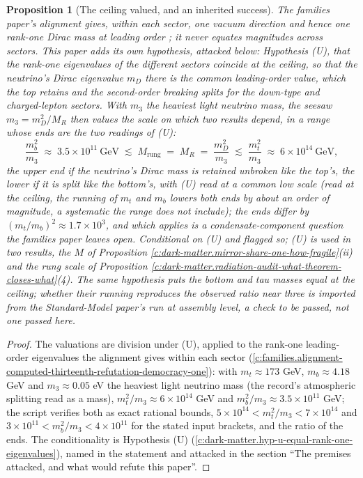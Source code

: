 \documentclass[11pt]{article}
\newtheorem{proposition}[theorem]{Proposition}
\theoremstyle{definition}
\theoremstyle{plain}
\newcommand{\changedmark}[2]{\marginpar{\raggedright\scriptsize\color{#1}#2}}
\begin{document}
\begin{proposition}[The ceiling valued, and an inherited success]\label{c:dark-matter.ceiling-valued-inherited-success}
\changedmark{gray}{reworded}
The families paper's alignment gives, within each sector, one vacuum direction and hence one rank-one Dirac mass at leading order \cite[Prop.~4.3]{ButlerT13}; it never equates magnitudes across sectors. This paper adds its own hypothesis, attacked below: \emph{Hypothesis (U)}, that the rank-one eigenvalues of the different sectors coincide at the ceiling, so that the neutrino's Dirac eigenvalue $m_{D}$ there is the common leading-order value, which the top retains and the second-order breaking splits for the down-type and charged-lepton sectors. With $m_{3}$ the heaviest light neutrino mass, the seesaw $m_{3} = m_{D}^{2}/M_{R}$ then values the scale on which two results depend, in a range whose ends are the two readings of (U):
\[
\frac{m_{b}^{2}}{m_{3}} \;\approx\; 3.5 \times 10^{11}\ \mathrm{GeV} \;\lesssim\; M_{\mathrm{rung}} \;=\; M_{R} \;=\; \frac{m_{D}^{2}}{m_{3}} \;\lesssim\; \frac{m_{t}^{2}}{m_{3}} \;\approx\; 6 \times 10^{14}\ \mathrm{GeV},
\]
the upper end if the neutrino's Dirac mass is retained unbroken like the top's, the lower if it is split like the bottom's, with (U) read at a common low scale (read at the ceiling, the running of $m_{t}$ and $m_{b}$ lowers both ends by about an order of magnitude, a systematic the range does not include); the ends differ by $(m_{t}/m_{b})^{2} \approx 1.7 \times 10^{3}$, and which applies is a condensate-component question the families paper leaves open. Conditional on (U) and flagged so; (U) is used in two results, the $M$ of Proposition \ref{c:dark-matter.mirror-share-one-how-fragile}(ii) and the rung scale of Proposition \ref{c:dark-matter.radiation-audit-what-theorem-closes-what}(4). The same hypothesis puts the bottom and tau masses equal at the ceiling; whether their running reproduces the observed ratio near three is imported from the Standard-Model paper's run \cite{ButlerT12} at assembly level, a check to be passed, not one passed here.
\end{proposition}
\begin{proof}
The valuations are division under (U), applied to the rank-one leading-order eigenvalues the alignment gives within each sector (\ref{c:families.alignment-computed-thirteenth-refutation-democracy-one}): with $m_{t} \approx 173$ GeV, $m_{b} \approx 4.18$ GeV and $m_{3} \approx 0.05$ eV the heaviest light neutrino mass (the record's atmospheric splitting read as a mass), $m_{t}^{2}/m_{3} \approx 6 \times 10^{14}$ GeV and $m_{b}^{2}/m_{3} \approx 3.5 \times 10^{11}$ GeV; the script verifies both as exact rational bounds, $5 \times 10^{14} < m_{t}^{2}/m_{3} < 7 \times 10^{14}$ and $3 \times 10^{11} < m_{b}^{2}/m_{3} < 4 \times 10^{11}$ for the stated input brackets, and the ratio of the ends. The conditionality is Hypothesis (U) (\ref{c:dark-matter.hyp-u-equal-rank-one-eigenvalues}), named in the statement and attacked in the section ``The premises attacked, and what would refute this paper''.

\end{proof}
\end{document}
